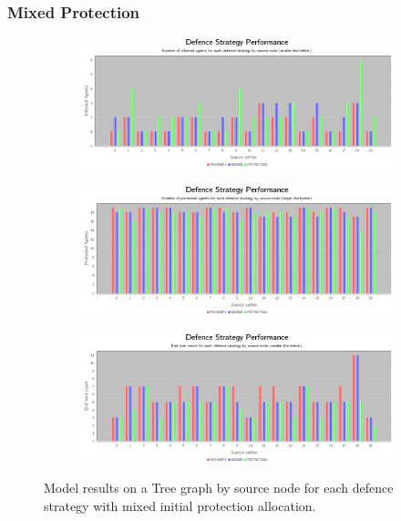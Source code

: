 \documentclass[results.tex]{subfiles}
\begin{document}
\newpage


\subsubsection{Mixed Protection}



\newpage

\begin{figure}[!ht]
\centering
     \begin{subfigure}[b]{0.9\textwidth}
         \centering
         \includegraphics[width=\textwidth]{Tree/Mixed/MixedInfectedChart}
         \label{fig:tree-mix-infected}
     \end{subfigure}
     \vfill
     \begin{subfigure}[b]{0.9\textwidth}
         \centering
         \includegraphics[width=\textwidth]{Tree/Mixed/MixedProtectedChart}
         \label{fig:tree-mix-protected}
     \end{subfigure}
     \vfill
     \begin{subfigure}[b]{0.9\textwidth}
         \centering
         \includegraphics[width=\textwidth]{Tree/Mixed/MixedEndTurnChart}
         \label{fig:tree-mix-end}
     \end{subfigure}
        \caption{Model results on a Tree graph by source node for each defence strategy with mixed initial protection allocation.}
        \label{fig:tree-mix-charts}
\end{figure}
\end{document}
